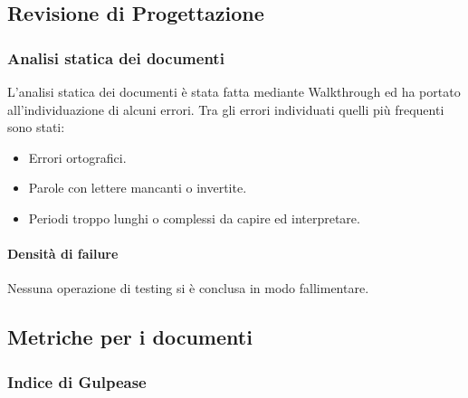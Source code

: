 \newpage

\subsection{Revisione di Progettazione}

\subsubsection{Analisi statica dei documenti}
L'analisi statica dei documenti è stata fatta mediante Walkthrough ed ha portato all'individuazione di alcuni errori. Tra gli errori individuati quelli più frequenti sono stati:
		\begin{itemize}
			\item Errori ortografici.
			\item Parole con lettere mancanti o invertite.
			\item Periodi troppo lunghi o complessi da capire ed interpretare.
		\end{itemize}

\paragraph{Densità di failure}

Nessuna operazione di testing si è conclusa in modo fallimentare.

\subsection{Metriche per i documenti}

\subsubsection{Indice di Gulpease}

